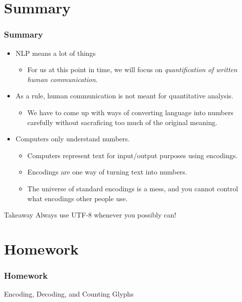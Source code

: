 \documentclass[smaller,xcolor=table,aspectratio=169]{beamer}
\begin{document}
						\section*{Summary}

						\begin{frame}
							\frametitle{Summary}
							\begin{itemize}
								\item NLP means a lot of things
								      \begin{itemize}
								      	\item For us at this point in time, we will focus on {\itshape quantification of written human communication}.
								      \end{itemize}
								\item As a rule, human communication is not meant for quantitative analysis.
								      \begin{itemize}
								      	\item We have to come up with ways of converting language into numbers carefully without sacraficing too much of the original meaning.
								      \end{itemize}
								\item Computers only understand numbers.
								      \begin{itemize}
								      	\item Computers represent text for input/output purposes using encodings.
								      	\item Encodings are one way of turning text into numbers.
								      	\item The universe of standard encodings is a mess, and you cannot control what encodings other people use.
								      \end{itemize}
							\end{itemize}
							\begin{alertblock}{Takeaway}
								Always use UTF-8 whenever you possibly can!
							\end{alertblock}
						\end{frame}

						\section*{Homework}

						\begin{frame}
							\frametitle{Homework}
							Encoding, Decoding, and Counting Glyphs
						\end{frame}
\end{document}
